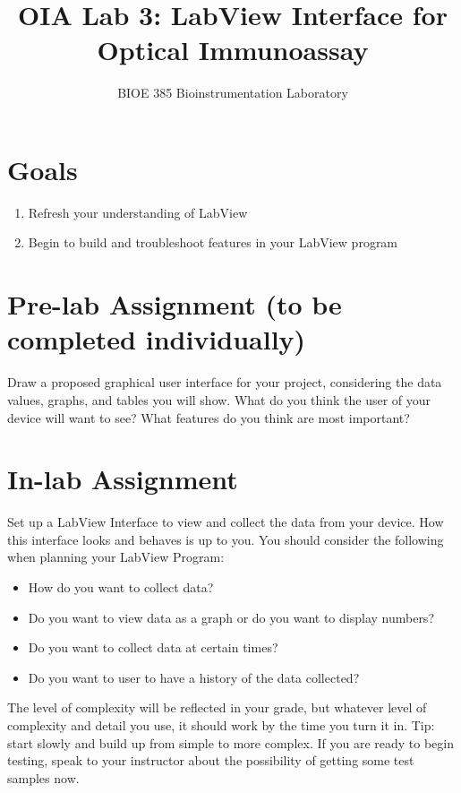 \documentclass{article}
\title{OIA Lab 3: LabView Interface for Optical Immunoassay}
\author{BIOE 385 Bioinstrumentation Laboratory}
\date{}
\begin{document}
\large
\maketitle

\section*{Goals}
\begin{enumerate}
	\item Refresh your understanding of LabView
	\item Begin to build and troubleshoot features in your LabView program
\end{enumerate}

\section*{Pre-lab Assignment (to be completed individually)}
Draw a proposed graphical user interface for your project, considering the data values, graphs, and tables you will show. What do you think the user of your device will want to see? What features do you think are most important?

\section*{In-lab Assignment}
Set up a LabView Interface to view and collect the data from your device. How this interface looks and behaves is up to you. You should consider the following when planning your LabView Program:
	\begin{itemize}
		\item How do you want to collect data?
		\item Do you want to view data as a graph or do you want to display numbers?
		\item Do you want to collect data at certain times?
		\item Do you want to user to have a history of the data collected?
	\end{itemize}

The level of complexity will be reflected in your grade, but whatever level of complexity and detail you use, it should work by the time you turn it in. Tip: start slowly and build up from simple to more complex. If you are ready to begin testing, speak to your instructor about the possibility of getting some test samples now.
\end{document}
